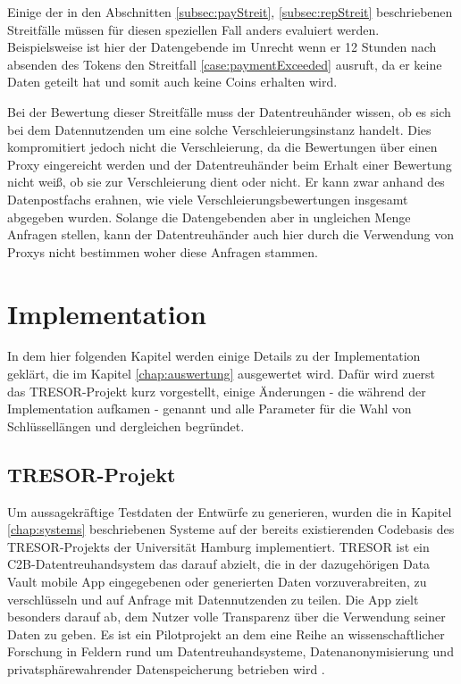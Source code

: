 \documentclass{scrreprt}
\begin{document}
Einige der in den Abschnitten \ref{subsec:payStreit}, \ref{subsec:repStreit} beschriebenen Streitfälle müssen für diesen speziellen Fall anders evaluiert werden. Beispielsweise ist hier der Datengebende im Unrecht wenn er 12 Stunden nach absenden des Tokens den Streitfall \ref{case:paymentExceeded} ausruft, da er keine Daten geteilt hat und somit auch keine Coins erhalten wird.

Bei der Bewertung dieser Streitfälle muss der Datentreuhänder wissen, ob es sich bei dem Datennutzenden um eine solche Verschleierungsinstanz handelt. Dies kompromitiert jedoch nicht die Verschleierung, da die Bewertungen über einen Proxy eingereicht werden und der Datentreuhänder beim Erhalt einer Bewertung nicht weiß, ob sie zur Verschleierung dient oder nicht. Er kann zwar anhand des Datenpostfachs erahnen, wie viele Verschleierungsbewertungen insgesamt abgegeben wurden. Solange die Datengebenden aber in ungleichen Menge Anfragen stellen, kann der Datentreuhänder auch hier durch die Verwendung von Proxys nicht bestimmen woher diese Anfragen stammen.




\chapter{Implementation}
\label{chap:impl}
In dem hier folgenden Kapitel werden einige Details zu der Implementation geklärt, die im Kapitel \ref{chap:auswertung} ausgewertet wird. Dafür wird zuerst das TRESOR-Projekt kurz vorgestellt, einige Änderungen - die während der Implementation aufkamen - genannt und alle Parameter für die Wahl von Schlüssellängen und dergleichen begründet.

\section{TRESOR-Projekt}
Um aussagekräftige Testdaten der Entwürfe zu generieren, wurden die in Kapitel \ref{chap:systems} beschriebenen Systeme auf der bereits existierenden Codebasis des TRESOR-Projekts der Universität Hamburg implementiert. TRESOR ist ein C2B-Datentreuhandsystem das darauf abzielt, die in der dazugehörigen Data Vault mobile App eingegebenen oder generierten Daten vorzuverabreiten, zu verschlüsseln und auf Anfrage mit Datennutzenden zu teilen. Die App zielt besonders darauf ab, dem Nutzer volle Transparenz über die Verwendung seiner Daten zu geben. Es ist ein Pilotprojekt an dem eine Reihe an wissenschaftlicher Forschung in Feldern rund um Datentreuhandsysteme, Datenanonymisierung und privatsphärewahrender Datenspeicherung betrieben wird \cite{TRESOR}.
\end{document}
